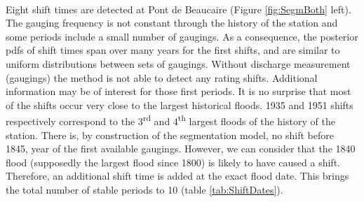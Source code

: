\documentclass[11pt]{article}
\begin{document}
    \paragraph{}
    Eight shift times are detected at Pont de Beaucaire (Figure \ref{fig:SegmBoth} left). The gauging frequency is not constant through the history of the station and some periods include a small number of gaugings. As a consequence, the posterior pdfs of shift times span over many years for the first shifts, and are similar to uniform distributions between sets of gaugings. Without discharge measurement (gaugings) the method is not able to detect any rating shifts. Additional information may be of interest for those first periods. It is no surprise that most of the shifts occur very close to the largest historical floods. 1935 and 1951 shifts respectively correspond to the 3\textsuperscript{rd} and 4\textsuperscript{th} largest floods of the history of the station. There is, by construction of the segmentation model, no shift before 1845, year of the first available gaugings. However, we can consider that the 1840 flood (supposedly the largest flood since 1800) is likely to have caused a shift. Therefore, an additional shift time is added at the exact flood date. This brings the total number of stable periods to 10 (table \ref{tab:ShiftDates}). 
    
\end{document}
